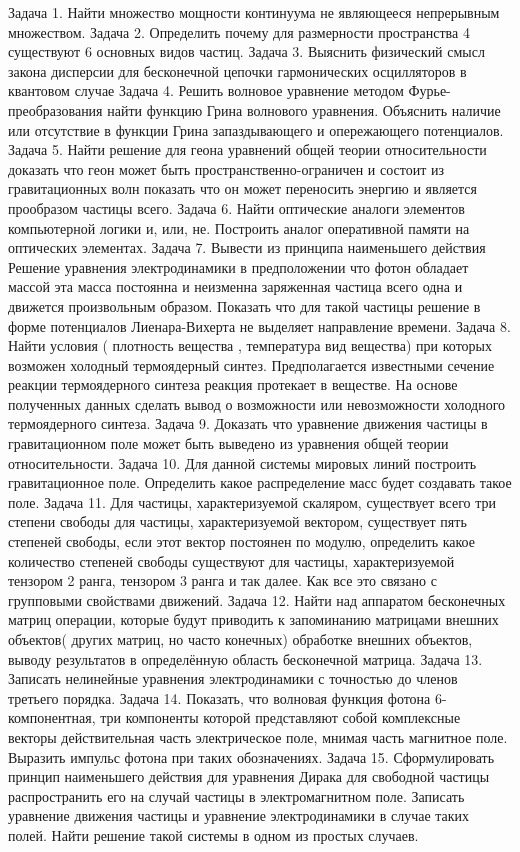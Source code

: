 Задача 1.
Найти множество мощности континуума не являющееся непрерывным множеством.
Задача 2.
Определить почему для размерности пространства 4 существуют 6 основных видов частиц.
Задача 3.
Выяснить физический смысл закона дисперсии для бесконечной цепочки гармонических осцилляторов в квантовом случае
Задача 4.
Решить волновое уравнение методом Фурье-преобразования найти функцию Грина волнового уравнения.  Объяснить наличие или отсутствие в функции Грина запаздывающего  и опережающего потенциалов.
Задача 5.
Найти решение для геона уравнений общей теории относительности доказать что геон может быть пространственно-ограничен и состоит из гравитационных волн показать что он может переносить энергию и является прообразом частицы всего.
Задача 6.
Найти оптические аналоги элементов компьютерной логики и, или, не.  Построить аналог оперативной памяти на оптических элементах.
Задача 7.
Вывести из принципа наименьшего действия Решение уравнения электродинамики  в предположении что фотон обладает массой эта масса постоянна и неизменна заряженная частица всего одна и движется произвольным образом.  Показать что для такой частицы решение в форме потенциалов Лиенара-Вихерта  не  выделяет направление времени.
Задача 8.
Найти условия ( плотность вещества , температура вид вещества) при которых возможен холодный термоядерный синтез. Предполагается известными сечение реакции термоядерного синтеза реакция протекает в веществе. На основе полученных данных сделать вывод о возможности или невозможности холодного термоядерного синтеза.
Задача 9.
Доказать что уравнение движения частицы в гравитационном поле может быть выведено из уравнения общей теории относительности.
Задача 10.
Для данной системы мировых линий построить гравитационное поле.  Определить какое распределение масс будет создавать такое поле.
Задача 11.
Для частицы, характеризуемой скаляром, существует всего три степени свободы для частицы, характеризуемой вектором, существует пять степеней свободы, если этот  вектор постоянен по модулю, определить какое количество степеней свободы существуют для частицы, характеризуемой тензором 2 ранга, тензором 3 ранга и так далее. Как все это связано с групповыми свойствами движений.
Задача 12.
Найти  над аппаратом бесконечных матриц операции, которые будут приводить к запоминанию  матрицами внешних объектов( других матриц,  но часто конечных) обработке внешних объектов, выводу результатов в определённую область бесконечной матрица.
Задача 13.
Записать нелинейные уравнения электродинамики с точностью до членов третьего порядка.
Задача 14.
Показать, что волновая функция фотона 6-компонентная, три компоненты которой представляют собой комплексные векторы действительная часть электрическое поле, мнимая часть магнитное поле. Выразить импульс фотона при таких обозначениях.
Задача 15.
Сформулировать принцип наименьшего действия для уравнения Дирака для свободной частицы распространить его на случай частицы в электромагнитном поле.  Записать уравнение движения частицы и уравнение электродинамики в случае таких полей. Найти решение такой системы в одном из простых случаев.